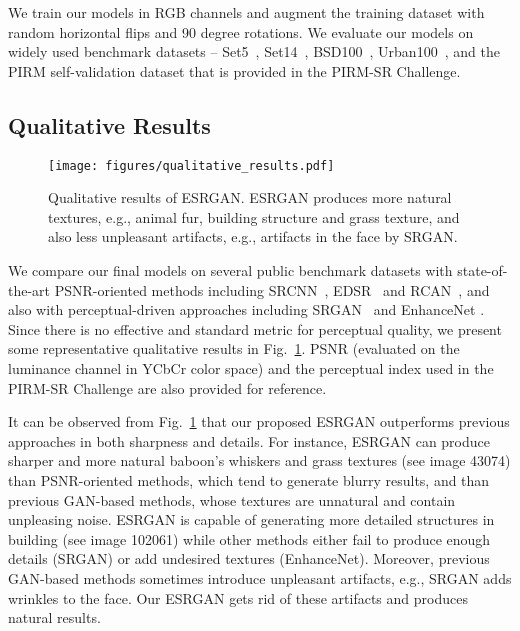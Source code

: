 \documentclass[runningheads]{llncs}
\begin{document}
We train our models in RGB channels and augment the training dataset with random horizontal flips and 90 degree 
rotations.
We evaluate our models on widely used benchmark datasets -- Set5~\cite{bevilacqua2012low}, 
Set14~\cite{zeyde2010single}, BSD100~\cite{martin2001database}, Urban100~\cite{huang2015single}, and the
PIRM self-validation dataset that is provided in the PIRM-SR Challenge.

\subsection{Qualitative Results}

\begin{figure}[htbp]
	\begin{center}
		\texttt{[image: figures/qualitative\_results.pdf]}
	\end{center}
	\vspace{-0.5cm}
	\caption{Qualitative results of ESRGAN. ESRGAN produces more natural textures, e.g., animal fur, building structure 
		and grass texture, and also less unpleasant artifacts, e.g., artifacts in the face by SRGAN.}
	\label{fig:qualitative_results}
	\vspace{-0.3cm}
\end{figure}

We compare our final models on several public benchmark datasets with state-of-the-art PSNR-oriented methods including 
SRCNN~\cite{dong2014learning}, EDSR~\cite{lim2017enhanced} and RCAN~\cite{zhang2018image}, and also with 
perceptual-driven approaches including SRGAN~\cite{ledig2017photo} and EnhanceNet \cite{sajjadi2017enhancenet}. 
Since there is no effective and standard metric for perceptual quality, we present some representative qualitative  
results in Fig.~\ref{fig:qualitative_results}. 
PSNR (evaluated on the luminance channel in YCbCr color space) and the perceptual index used in the PIRM-SR Challenge 
are 
also provided for reference.


It can be observed from Fig.~\ref{fig:qualitative_results} that our proposed ESRGAN outperforms previous approaches in 
both sharpness and details.
For instance, ESRGAN can produce sharper and more natural baboon's whiskers and grass textures (see image 43074) than 
PSNR-oriented 
methods, which tend to generate blurry results, and than previous GAN-based methods, whose textures are unnatural and 
contain unpleasing noise. 
ESRGAN is capable of generating more detailed structures in building (see image 102061) while other methods either fail 
to produce enough details (SRGAN) or add undesired textures (EnhanceNet).
Moreover, previous GAN-based methods sometimes introduce unpleasant artifacts, e.g., SRGAN adds wrinkles to the face. 
Our 
ESRGAN gets rid of these artifacts and produces natural results.
\end{document}
